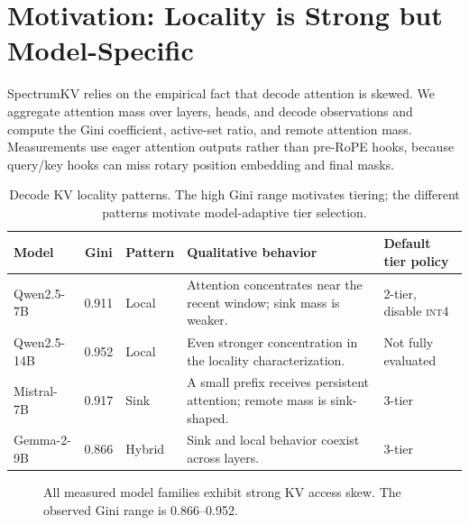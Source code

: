 \documentclass[11pt]{article}
\newcommand{\method}{SpectrumKV}
\newcommand{\intiv}{\textsc{int4}}
\theoremstyle{plain}
\theoremstyle{definition}
\begin{document}
\section{Motivation: Locality is Strong but Model-Specific}
\label{sec:motivation}

\method{} relies on the empirical fact that decode attention is skewed.  We aggregate attention mass over layers, heads, and decode observations and compute the Gini coefficient, active-set ratio, and remote attention mass.  Measurements use eager attention outputs rather than pre-RoPE hooks, because query/key hooks can miss rotary position embedding and final masks.

\begin{table}[t]
\centering
\caption{Decode KV locality patterns.  The high Gini range motivates tiering; the different patterns motivate model-adaptive tier selection.}
\label{tab:locality}
\begin{tabularx}{\linewidth}{lclYl}
\toprule
Model & Gini & Pattern & Qualitative behavior & Default tier policy \\
\midrule
Qwen2.5-7B & 0.911 & Local & Attention concentrates near the recent window; sink mass is weaker. & 2-tier, disable \intiv{} \\
Qwen2.5-14B & 0.952 & Local & Even stronger concentration in the locality characterization. & Not fully evaluated \\
Mistral-7B & 0.917 & Sink & A small prefix receives persistent attention; remote mass is sink-shaped. & 3-tier \\
Gemma-2-9B & 0.866 & Hybrid & Sink and local behavior coexist across layers. & 3-tier \\
\bottomrule
\end{tabularx}
\end{table}

\begin{figure}[t]
\centering
{}
\caption{All measured model families exhibit strong KV access skew.  The observed Gini range is 0.866--0.952.}
\label{fig:gini}
\end{figure}
\end{document}
